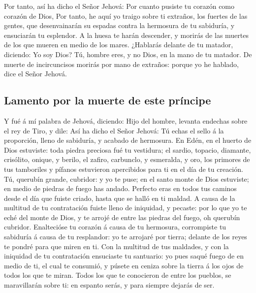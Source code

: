  Por tanto, así ha dicho el Señor Jehová: Por cuanto pusiste
tu corazón como corazón de Dios,  Por tanto, he aquí yo
traigo sobre ti extraños, los fuertes de las gentes, que desenvainarán
su espadas contra la hermosura de tu sabiduría, y ensuciarán tu
esplendor.  A la huesa te harán descender, y morirás de las
muertes de los que mueren en medio de los mares.  ¿Hablarás
delante de tu matador, diciendo: Yo soy Dios? Tú, hombre eres, y no
Dios, en la mano de tu matador.  De muerte de incircuncisos
morirás por mano de extraños: porque yo he hablado, dice el Señor
Jehová.

\hypertarget{lamento-por-la-muerte-de-este-pruxedncipe}{%
\subsection{Lamento por la muerte de este
príncipe}\label{lamento-por-la-muerte-de-este-pruxedncipe}}

 Y fué á mí palabra de Jehová, diciendo:  Hijo
del hombre, levanta endechas sobre el rey de Tiro, y dile: Así ha dicho
el Señor Jehová: Tú echas el sello á la proporción, lleno de sabiduría,
y acabado de hermosura.  En Edén, en el huerto de Dios
estuviste: toda piedra preciosa fué tu vestidura; el sardio, topacio,
diamante, crisólito, onique, y berilo, el zafiro, carbunclo, y
esmeralda, y oro, los primores de tus tamboriles y pífanos estuvieron
apercibidos para ti en el día de tu creación.  Tú, querubín
grande, cubridor: y yo te puse; en el santo monte de Dios estuviste; en
medio de piedras de fuego has andado.  Perfecto eras en
todos tus caminos desde el día que fuiste criado, hasta que se halló en
ti maldad.  A causa de la multitud de tu contratación
fuiste lleno de iniquidad, y pecaste: por lo que yo te eché del monte de
Dios, y te arrojé de entre las piedras del fuego, oh querubín cubridor.
 Enaltecióse tu corazón á causa de tu hermosura,
corrompiste tu sabiduría á causa de tu resplandor: yo te arrojaré por
tierra; delante de los reyes te pondré para que miren en ti.
 Con la multitud de tus maldades, y con la iniquidad de tu
contratación ensuciaste tu santuario: yo pues saqué fuego de en medio de
ti, el cual te consumió, y púsete en ceniza sobre la tierra á los ojos
de todos los que te miran.  Todos los que te conocieron de
entre los pueblos, se maravillarán sobre ti: en espanto serás, y para
siempre dejarás de ser.

